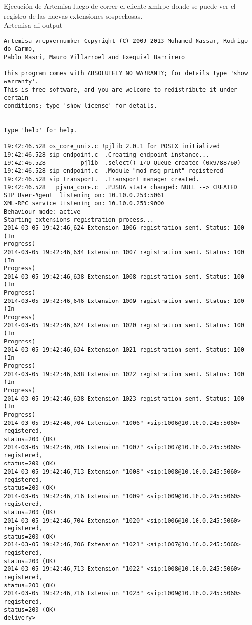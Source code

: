 \documentclass[a4paper,12pt]{report}
\newenvironment{myscriptlisting}
{\begin{list}{}{\setlength{\leftmargin}{1em}}\item\scriptsize\bfseries}
{\end{list}}
\begin{document}
Ejecución de Artemisa luego de correr el cliente \ac{xmlrpc} donde se puede ver el
registro de las nuevas extensiones sospechosas.\\

Artemisa cli output
\begin{myscriptlisting}   
  \begin{verbatim}
Artemisa vrepvernumber Copyright (C) 2009-2013 Mohamed Nassar, Rodrigo do Carmo,
Pablo Masri, Mauro Villarroel and Exequiel Barrirero

This program comes with ABSOLUTELY NO WARRANTY; for details type 'show
warranty'.
This is free software, and you are welcome to redistribute it under certain
conditions; type 'show license' for details.


Type 'help' for help.

19:42:46.528 os_core_unix.c !pjlib 2.0.1 for POSIX initialized
19:42:46.528 sip_endpoint.c  .Creating endpoint instance...
19:42:46.528          pjlib  .select() I/O Queue created (0x9788760)
19:42:46.528 sip_endpoint.c  .Module "mod-msg-print" registered
19:42:46.528 sip_transport.  .Transport manager created.
19:42:46.528   pjsua_core.c  .PJSUA state changed: NULL --> CREATED
SIP User-Agent  listening on: 10.10.0.250:5061
XML-RPC service listening on: 10.10.0.250:9000
Behaviour mode: active
Starting extensions registration process...
2014-03-05 19:42:46,624 Extension 1006 registration sent. Status: 100 (In
Progress)
2014-03-05 19:42:46,634 Extension 1007 registration sent. Status: 100 (In
Progress)
2014-03-05 19:42:46,638 Extension 1008 registration sent. Status: 100 (In
Progress)
2014-03-05 19:42:46,646 Extension 1009 registration sent. Status: 100 (In
Progress)
2014-03-05 19:42:46,624 Extension 1020 registration sent. Status: 100 (In
Progress)
2014-03-05 19:42:46,634 Extension 1021 registration sent. Status: 100 (In
Progress)
2014-03-05 19:42:46,638 Extension 1022 registration sent. Status: 100 (In
Progress)
2014-03-05 19:42:46,638 Extension 1023 registration sent. Status: 100 (In
Progress)
2014-03-05 19:42:46,704 Extension "1006" <sip:1006@10.10.0.245:5060> registered,
status=200 (OK)
2014-03-05 19:42:46,706 Extension "1007" <sip:1007@10.10.0.245:5060> registered,
status=200 (OK)
2014-03-05 19:42:46,713 Extension "1008" <sip:1008@10.10.0.245:5060> registered,
status=200 (OK)
2014-03-05 19:42:46,716 Extension "1009" <sip:1009@10.10.0.245:5060> registered,
status=200 (OK)
2014-03-05 19:42:46,704 Extension "1020" <sip:1006@10.10.0.245:5060> registered,
status=200 (OK)
2014-03-05 19:42:46,706 Extension "1021" <sip:1007@10.10.0.245:5060> registered,
status=200 (OK)
2014-03-05 19:42:46,713 Extension "1022" <sip:1008@10.10.0.245:5060> registered,
status=200 (OK)
2014-03-05 19:42:46,716 Extension "1023" <sip:1009@10.10.0.245:5060> registered,
status=200 (OK)
delivery> 
  \end{verbatim}
\end{myscriptlisting}
\end{document}

